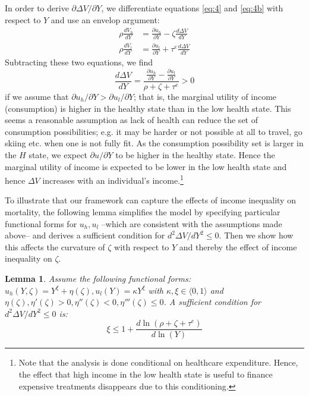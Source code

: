 \documentclass[a4paper,12pt]{article}
\newtheorem{lemma}{Lemma}
\begin{document}
In order to derive \(\partial \Delta V/ \partial Y\), we differentiate equations \eqref{eq:4} and \eqref{eq:4b} with respect to \(Y\) and use an envelop argument:
\begin{align}
\label{eq:25}
\rho \frac{dV_h}{dY} &= \frac{\partial u_h}{\partial Y} - \zeta \frac{d \Delta V}{d Y} \\
\label{eq:25b}
\rho \frac{dV_l}{dY} &= \frac{\partial u_l}{\partial Y} + \tau^e \frac{d \Delta V}{d Y}
\end{align}
Subtracting these two equations, we find
\begin{equation}
\label{eq:26}
\frac{d \Delta V}{dY} = \frac{\frac{\partial u_h}{\partial Y} - \frac{\partial u_l}{\partial Y}}{\rho + \zeta + \tau^e} > 0
\end{equation}
if we assume that \(\partial u_h/\partial Y > \partial u_l /\partial Y\); that is, the marginal utility of income (consumption) is higher in the healthy state than in the low health state. This seems a reasonable assumption as lack of health can reduce the set of consumption possibilities; e.g. it may be harder or not possible at all to travel, go skiing etc. when one is not fully fit. As the consumption possibility set is larger in the \(H\) state, we expect \(\partial u/\partial Y\) to be higher in the healthy state. Hence the marginal utility of income is expected to be lower in the low health state and hence \(\Delta V\) increases with an individual's income.\footnote{Note that the analysis is done conditional on healthcare expenditure. Hence, the effect that high income in the low health state is useful to finance expensive treatments disappears due to this conditioning.}

To illustrate that our framework can capture the effects of income inequality on mortality, the following lemma simplifies the model by specifying particular functional forms for \(u_h, u_l\) --which are consistent with the assumptions made above-- and derives a sufficient condition for \(d^2 \Delta V/dY^2 \leq 0\). Then we show how this affects the curvature of \(\zeta\) with respect to \(Y\) and thereby the effect of income inequality on \(\zeta\).

\begin{lemma}
\label{lem:VY}
Assume the following functional forms: \(u_h(Y,\zeta)=Y^{\xi} + \eta(\zeta), u_l(Y)=\kappa Y^{\xi}\) with \(\kappa, \xi \in \langle 0,1 \rangle\) and \(\eta(\zeta),  \eta'(\zeta) > 0, \eta''(\zeta) < 0, \eta'''(\zeta) \leq 0\). A sufficient condition for \(d^2 \Delta V/dY^2 \leq 0\) is:
\begin{equation}
\label{eq:24}
\xi \leq 1 + \frac{d \ln(\rho+\zeta+\tau^e)}{d \ln(Y)}
\end{equation}
\end{lemma}
\end{document}

